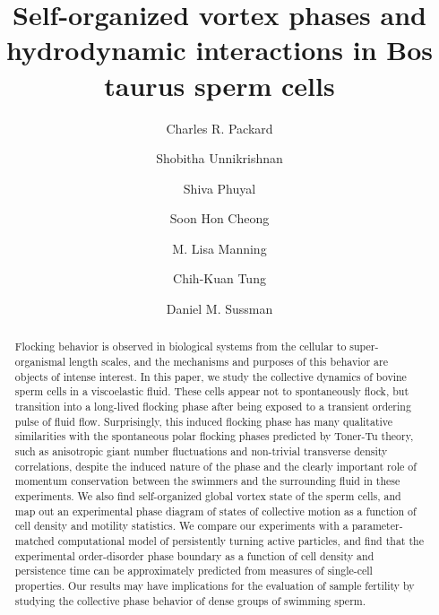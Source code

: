 \documentclass[reprint,unsortedaddress,amsmath,amssymb,aps,pre]{revtex4-2}
\begin{document}
\title{Self-organized vortex phases and hydrodynamic interactions in Bos taurus sperm cells}%

\author{Charles R. Packard}

\author{Shobitha Unnikrishnan}
\author{Shiva Phuyal}

\author{Soon Hon Cheong}

\author{M. Lisa Manning}

\author{Chih-Kuan Tung}

\author{Daniel M. Sussman}



\begin{abstract}
Flocking behavior is observed in biological systems from the cellular to super-organismal length scales, and the mechanisms and purposes of this behavior are objects of intense interest. In this paper, we study the collective dynamics of bovine sperm cells in a viscoelastic fluid. These cells appear not to spontaneously flock, but transition into a long-lived flocking phase after being exposed to a transient ordering pulse of fluid flow. Surprisingly, this induced flocking phase has many qualitative similarities with the spontaneous polar flocking phases predicted by Toner-Tu theory, such as anisotropic giant number fluctuations and non-trivial transverse density correlations, despite the induced nature of the phase and the clearly important role of momentum conservation between the swimmers and the surrounding fluid in these experiments. We also find self-organized global vortex state of the sperm cells, and map out an experimental phase diagram of states of collective motion as a function of cell density and motility statistics. We compare our experiments with a parameter-matched computational model of persistently turning active particles, and find that the experimental order-disorder phase boundary  as a function of cell density and persistence time can be approximately predicted from measures of single-cell properties. Our results may have implications for the evaluation of sample fertility by studying the collective phase behavior of dense groups of swimming sperm.
\end{abstract}
\end{document}

